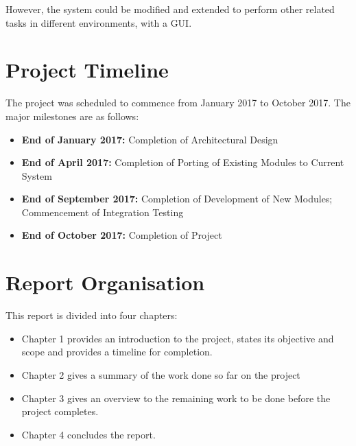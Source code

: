 However, the system could be modified and extended to perform other related tasks
in different environments, with a GUI\@.

\section{Project Timeline}

The project was scheduled to commence from January 2017 to October 2017. The major
milestones are as follows:

\begin{itemize}
    \item \textbf{End of January 2017:} Completion of Architectural Design
    \item \textbf{End of April 2017:} Completion of Porting of Existing Modules
    to Current System
    \item \textbf{End of September 2017:} Completion of Development of New Modules;
    Commencement of Integration Testing
    \item \textbf{End of October 2017:} Completion of Project
\end{itemize}

\section{Report Organisation}

This report is divided into four chapters:

\begin{itemize}
    \item Chapter 1 provides an introduction to the project, states its objective
    and scope and provides a timeline for completion.
    \item Chapter 2 gives a summary of the work done so far on the project
    \item Chapter 3 gives an overview to the remaining work to be done before the
    project completes.
    \item Chapter 4 concludes the report.
\end{itemize}